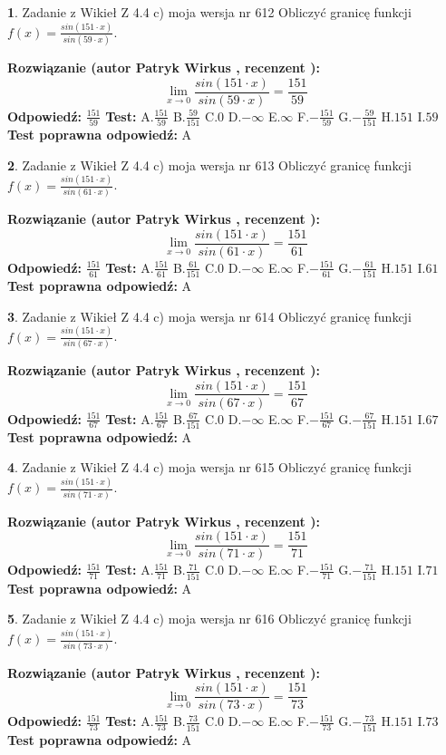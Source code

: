 \documentclass[12pt, a4paper]{article}
\theoremstyle{definition} %
\newtheorem{zad}{}
\newcommand{\zadStart}[1]{\begin{zad}#1\newline}
\newcommand{\zadStop}{\end{zad}}
\newcommand{\rozwStart}[2]{\noindent \textbf{Rozwiązanie (autor #1 , recenzent #2): }\newline}
\newcommand{\rozwStop}{\newline}
\newcommand{\odpStart}{\noindent \textbf{Odpowiedź:}\newline}
\newcommand{\odpStop}{\newline}
\newcommand{\testStart}{\noindent \textbf{Test:}\newline}
\newcommand{\testStop}{\newline}
\newcommand{\kluczStart}{\noindent \textbf{Test poprawna odpowiedź:}\newline}
\newcommand{\kluczStop}{\newline}
\begin{document}
\zadStart{Zadanie z Wikieł Z 4.4 c) moja wersja nr 612}
Obliczyć granicę funkcji $f(x)=\frac{sin(151\cdot x)}{sin(59\cdot x)}$.
\zadStop
\rozwStart{Patryk Wirkus}{}
$$\lim\limits_{x\to 0}\frac{sin(151\cdot x)}{sin(59\cdot x)}=
\frac{151}{59}$$
\rozwStop
\odpStart
$\frac{151}{59}$
\odpStop
\testStart
A.$\frac{151}{59}$
B.$\frac{59}{151}$
C.$0$
D.$-\infty$
E.$\infty$
F.$-\frac{151}{59}$
G.$-\frac{59}{151}$
H.$151$
I.$59$
\testStop
\kluczStart
A
\kluczStop



\zadStart{Zadanie z Wikieł Z 4.4 c) moja wersja nr 613}
Obliczyć granicę funkcji $f(x)=\frac{sin(151\cdot x)}{sin(61\cdot x)}$.
\zadStop
\rozwStart{Patryk Wirkus}{}
$$\lim\limits_{x\to 0}\frac{sin(151\cdot x)}{sin(61\cdot x)}=
\frac{151}{61}$$
\rozwStop
\odpStart
$\frac{151}{61}$
\odpStop
\testStart
A.$\frac{151}{61}$
B.$\frac{61}{151}$
C.$0$
D.$-\infty$
E.$\infty$
F.$-\frac{151}{61}$
G.$-\frac{61}{151}$
H.$151$
I.$61$
\testStop
\kluczStart
A
\kluczStop



\zadStart{Zadanie z Wikieł Z 4.4 c) moja wersja nr 614}
Obliczyć granicę funkcji $f(x)=\frac{sin(151\cdot x)}{sin(67\cdot x)}$.
\zadStop
\rozwStart{Patryk Wirkus}{}
$$\lim\limits_{x\to 0}\frac{sin(151\cdot x)}{sin(67\cdot x)}=
\frac{151}{67}$$
\rozwStop
\odpStart
$\frac{151}{67}$
\odpStop
\testStart
A.$\frac{151}{67}$
B.$\frac{67}{151}$
C.$0$
D.$-\infty$
E.$\infty$
F.$-\frac{151}{67}$
G.$-\frac{67}{151}$
H.$151$
I.$67$
\testStop
\kluczStart
A
\kluczStop



\zadStart{Zadanie z Wikieł Z 4.4 c) moja wersja nr 615}
Obliczyć granicę funkcji $f(x)=\frac{sin(151\cdot x)}{sin(71\cdot x)}$.
\zadStop
\rozwStart{Patryk Wirkus}{}
$$\lim\limits_{x\to 0}\frac{sin(151\cdot x)}{sin(71\cdot x)}=
\frac{151}{71}$$
\rozwStop
\odpStart
$\frac{151}{71}$
\odpStop
\testStart
A.$\frac{151}{71}$
B.$\frac{71}{151}$
C.$0$
D.$-\infty$
E.$\infty$
F.$-\frac{151}{71}$
G.$-\frac{71}{151}$
H.$151$
I.$71$
\testStop
\kluczStart
A
\kluczStop



\zadStart{Zadanie z Wikieł Z 4.4 c) moja wersja nr 616}
Obliczyć granicę funkcji $f(x)=\frac{sin(151\cdot x)}{sin(73\cdot x)}$.
\zadStop
\rozwStart{Patryk Wirkus}{}
$$\lim\limits_{x\to 0}\frac{sin(151\cdot x)}{sin(73\cdot x)}=
\frac{151}{73}$$
\rozwStop
\odpStart
$\frac{151}{73}$
\odpStop
\testStart
A.$\frac{151}{73}$
B.$\frac{73}{151}$
C.$0$
D.$-\infty$
E.$\infty$
F.$-\frac{151}{73}$
G.$-\frac{73}{151}$
H.$151$
I.$73$
\testStop
\kluczStart
A
\kluczStop
\end{document}
